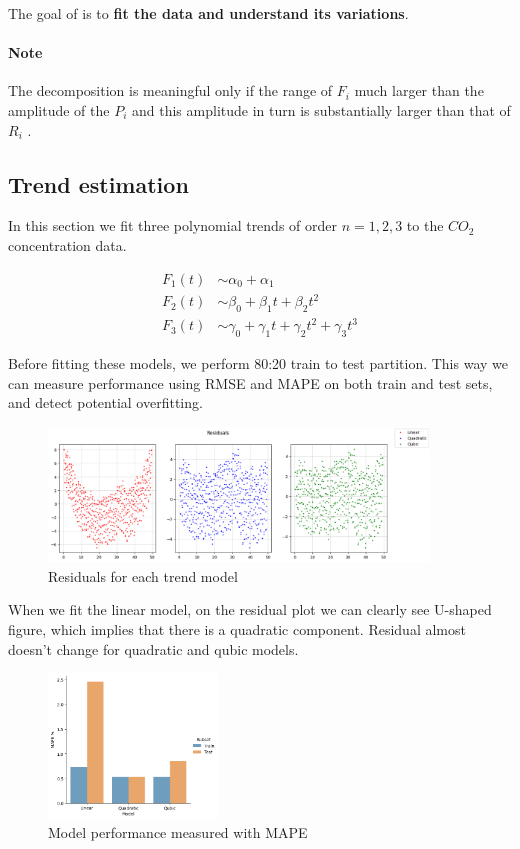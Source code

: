 \documentclass[12pt,a4paper]{article}
\begin{document}
The goal of is to \textbf{fit the data and understand its variations}.

\paragraph{Note} The decomposition is meaningful only if the range of $F_i$ much larger than the amplitude of the $P_i$ and this amplitude in turn is substantially larger than that of $R_i$ .

\subsection{Trend estimation}

In this section we fit three polynomial trends of order $n=1, 2, 3$ to the $CO_2$ concentration data. 

\begin{align}
	F_1 (t) &\sim \alpha_0 + \alpha_1 \\
	F_2 (t) &\sim \beta_0 + \beta_1 t + \beta_2 t^2 \\
	F_3 (t) &\sim \gamma_0 + \gamma_1 t + \gamma_2 t^2 + \gamma_3 t^3
\end{align}

Before fitting these models, we perform 80:20 train to test partition. This way we can measure performance using RMSE and MAPE on both train and test sets, and detect potential overfitting.

\begin{figure}[h!]
	\centering
	\includegraphics[width=0.9\textwidth]{figures/residuals.png}
	\caption{Residuals for each trend model}
\end{figure}

When we fit the linear model, on the residual plot we can clearly see U-shaped figure, which implies that there is a quadratic component. Residual almost doesn't change for quadratic and qubic models. 

\begin{figure}[h!]
	\centering
	\includegraphics[width=0.4\textwidth]{figures/performance.png}
	\caption{Model performance measured with MAPE}
\end{figure}
\end{document}
